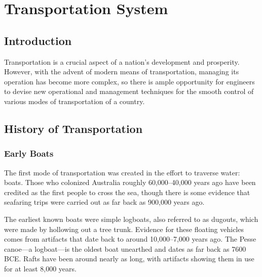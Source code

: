 \chapter{Transportation System}
%
\section{Introduction}
Transportation is a crucial aspect of a nation's development and prosperity. However, with the advent of modern means of transportation, managing its operation has become more complex, so there is ample opportunity for engineers to devise new operational and management techniques for the smooth control of various modes of transportation of a country. 

\section{History of Transportation}
\subsection*{Early Boats}
\par
The first mode of transportation was created in the effort to traverse water: boats. Those who colonized Australia roughly 60,000–40,000 years ago have been credited as the first people to cross the sea, though there is some evidence that seafaring trips were carried out as far back as 900,000 years ago.
\par
The earliest known boats were simple logboats, also referred to as dugouts, which were made by hollowing out a tree trunk. Evidence for these floating vehicles comes from artifacts that date back to around 10,000–7,000 years ago. The Pesse canoe—a logboat—is the oldest boat unearthed and dates as far back as 7600 BCE. Rafts have been around nearly as long, with artifacts showing them in use for at least 8,000 years.
